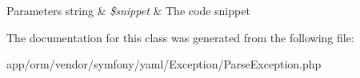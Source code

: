 \begin{DoxyParams}[1]{Parameters}
string & {\em \$snippet} & The code snippet \\
\hline
\end{DoxyParams}


The documentation for this class was generated from the following file\+:\begin{DoxyCompactItemize}
\item 
app/orm/vendor/symfony/yaml/\+Exception/Parse\+Exception.\+php\end{DoxyCompactItemize}
